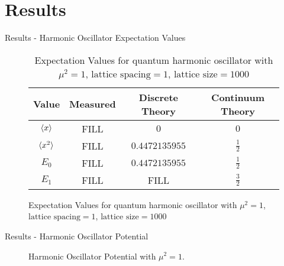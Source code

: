 \documentclass{beamer}
\begin{document}
\section{Results}

\begin{frame}{Results - Harmonic Oscillator Expectation Values}
    \begin{figure}
        \begin{table}
            \begin{tabular}{c | c | c | c }
                Value & Measured & Discrete Theory & Continuum Theory \\
                \hline \hline
                $\braket{x}$   & FILL &  $0$            & $0$           \\ 
                $\braket{x^2}$ & FILL &  $0.4472135955$ & $\frac{1}{2}$ \\
                $E_0$          & FILL &  $0.4472135955$ & $\frac{1}{2}$ \\
                $E_1$          & FILL &  FILL           & $\frac{3}{2}$  
            \end{tabular}
            \caption{Expectation Values for quantum harmonic oscillator with $\mu^2 = 1$, $\text{lattice spacing} = 1$, $\text{lattice size} = 1000$}
        \end{table}
    \end{figure}
\end{frame}

\begin{frame}{Results - Harmonic Oscillator Potential}
    \begin{figure}
    \centering
        \caption{Harmonic Oscillator Potential with $\mu^2 = 1$.}
    \end{figure}
\end{frame}
\end{document}
